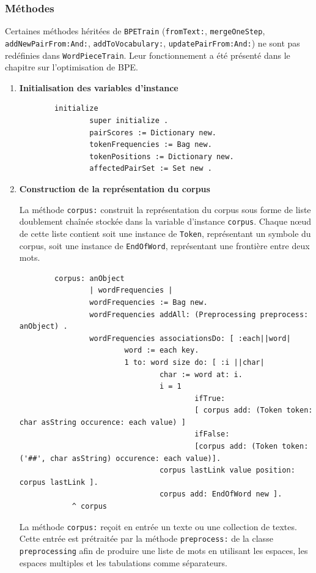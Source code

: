 \documentclass[12pt,a4paper]{report}
\begin{document}
	\subsubsection{Méthodes}
	
	Certaines méthodes héritées de \texttt{BPETrain} (\texttt{fromText:}, \texttt{mergeOneStep}, \texttt{addNewPairFrom:And:}, \texttt{addToVocabulary:}, \texttt{updatePairFrom:And:}) ne sont pas redéfinies dans \texttt{WordPieceTrain}. Leur fonctionnement a été présenté dans le chapitre sur l’optimisation de BPE.
	
	\begin{enumerate}
		\item \textbf{Initialisation des variables d’instance}
		
	\begin{verbatim}
		initialize
				super initialize .
				pairScores := Dictionary new.
				tokenFrequencies := Bag new.
				tokenPositions := Dictionary new.
				affectedPairSet := Set new .
	\end{verbatim}
	
	\item \textbf{Construction de la représentation du corpus}
	
	La méthode \texttt{corpus:} construit la représentation du corpus sous forme de liste doublement chaînée stockée dans la variable d’instance \texttt{corpus}. Chaque nœud de cette liste contient soit une instance de \texttt{Token}, représentant un symbole du corpus, soit une instance de \texttt{EndOfWord}, représentant une frontière entre deux mots.
	
	\begin{verbatim}
		corpus: anObject
				| wordFrequencies |
				wordFrequencies := Bag new.
				wordFrequencies addAll: (Preprocessing preprocess: anObject) .
				wordFrequencies associationsDo: [ :each||word|
						word := each key.
						1 to: word size do: [ :i ||char|
								char := word at: i.
								i = 1 
										ifTrue: 
										[ corpus add: (Token token: char asString occurence: each value) ]
										ifFalse:
										[corpus add: (Token token: ('##', char asString) occurence: each value)].
								corpus lastLink value position: corpus lastLink ].
								corpus add: EndOfWord new ].
			^ corpus
	\end{verbatim}
	
	La méthode \texttt{corpus:} reçoit en entrée un texte ou une collection de textes. Cette entrée est prétraitée par la méthode \texttt{preprocess:} de la classe \texttt{preprocessing} afin de produire une liste de mots en utilisant les espaces, les espaces multiples et les tabulations comme séparateurs.
	

\end{enumerate}
\end{document}
